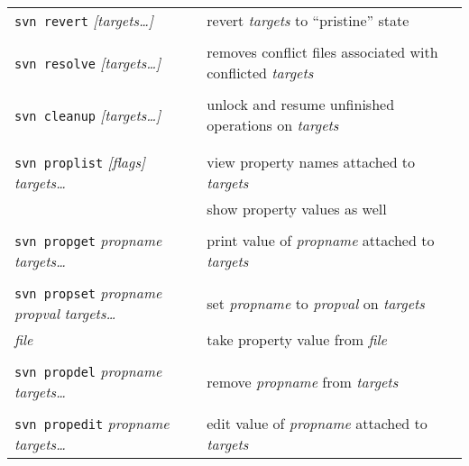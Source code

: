 \documentclass{report}
\begin{document}
\begin{tabular}{lp{2.8in}p{2.0in}}
\\
{\tt svn revert} {\sl [targets\dots]}	&
revert {\sl targets} to ``pristine'' state &  \\

\\
{\tt svn resolve} {\sl [targets\dots]}	&
removes conflict files associated with conflicted {\sl targets} &  \\

\\
{\tt svn cleanup} {\sl [targets\dots]}	&
unlock and resume unfinished operations on {\sl targets} &  \\


\\
\vspace{0.1in} \hspace{-0.1in}{\bf\Large Metadata} & \\

{\tt svn proplist} {\sl [flags]} {\sl targets\dots}    &
view property names attached to {\sl targets}    & \\

\hspace{0.5in}{\tt -v}		&
show property values as well	& \\

\\
{\tt svn propget} {\sl propname} {\sl targets\dots}    &
print value of {\sl propname} attached to {\sl targets}    & \\

\\
{\tt svn propset} {\sl propname} {\sl propval} {\sl targets\dots}    &
set {\sl propname} to {\sl propval} on {\sl targets}    & \\

\hspace{0.5in}{\tt -F} {\sl file}		&
take property value from {\sl file}	& \\

\\
{\tt svn propdel} {\sl propname} {\sl targets\dots}    &
remove {\sl propname} from {\sl targets}    & \\

\\
{\tt svn propedit} {\sl propname} {\sl targets\dots}    &
edit value of {\sl propname} attached to {\sl targets}    & \\



\end{tabular}
\end{document}
